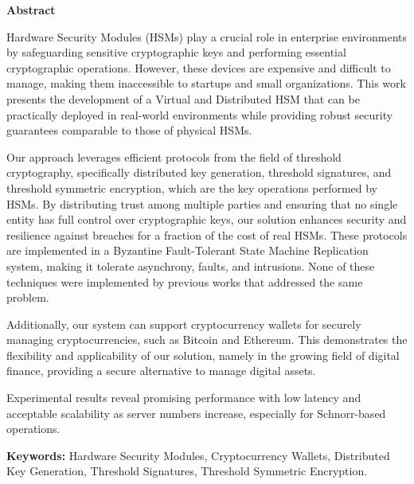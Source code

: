 \vspace*{2cm}
\begin{center}
\Large \bf Abstract
\end{center}
\vspace*{1cm} \setlength{\baselineskip}{0.6cm}

Hardware Security Modules (HSMs) play a crucial role in enterprise environments by safeguarding sensitive cryptographic keys and performing essential cryptographic operations. However, these devices are expensive and difficult to manage, making them inaccessible to startups and small organizations. This work presents the development of a Virtual and Distributed HSM that can be practically deployed in real-world environments while providing robust security guarantees comparable to those of physical HSMs.

Our approach leverages efficient protocols from the field of threshold cryptography, specifically distributed key generation, threshold signatures, and threshold symmetric encryption, which are the key operations performed by HSMs. By distributing trust among multiple parties and ensuring that no single entity has full control over cryptographic keys, our solution enhances security and resilience against breaches for a fraction of the cost of real HSMs. These protocols are implemented in a Byzantine Fault-Tolerant State Machine Replication system, making it tolerate asynchrony, faults, and intrusions. None of these techniques were implemented by previous works that addressed the same problem.

Additionally, our system can support cryptocurrency wallets for securely managing cryptocurrencies, such as Bitcoin and Ethereum. This demonstrates the flexibility and applicability of our solution, namely in the growing field of digital finance, providing a secure alternative to manage digital assets.

Experimental results reveal promising performance with low latency and acceptable scalability as server numbers increase, especially for Schnorr-based operations.


\vfill

\begin{flushleft}
\textbf{Keywords:} Hardware Security Modules, Cryptocurrency Wallets, Distributed Key Generation, Threshold Signatures, Threshold Symmetric Encryption.
\end{flushleft}

\LIMPA
{}

